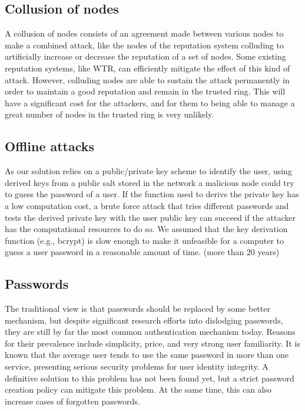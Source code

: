 \subsection{Collusion of nodes}

A collusion of nodes consists of an agreement made between various nodes to make
a combined attack, like the nodes of the reputation system colluding to artificially increase or decrease the reputation of a
set of nodes. Some existing
reputation systems, like WTR, can efficiently mitigate the effect of this kind
of attack. However, colluding nodes are able to sustain the attack
permanently in order to maintain a good reputation and remain in the trusted ring.
This will have a significant cost for the attackers, and for them to being able to manage a
great number of nodes in the trusted ring is very unlikely. 

\subsection{Offline attacks}
As our solution relies on a public/private key scheme to identify the user,
using derived keys from a public salt stored in the network a malicious node
could try to guess the password of a user. If the function used to derive the
private key has a low computation cost, a brute force attack that tries
different passwords and tests the derived private key with the user public key
can succeed if the attacker has the computational resources to do so. We
assumed that the key derivation function (e.g., bcrypt) is slow enough to make
it unfeasible for a computer to guess a user password in a reasonable 
amount of time. (more than 20 years)

\subsection{Passwords}
The traditional view is that passwords should be replaced by some better
mechanism, but despite significant research efforts into dislodging passwords,
they are still by far the most common authentication mechanism today.
Reasons for their prevalence include simplicity, price, and very strong user
familiarity.
It is known that the average user tends to use the
same password in more than one service, presenting serious security problems
for user identity integrity. A definitive solution to this problem has not
been found yet, but a strict password creation policy can mitigate this
problem. At the same time, this can also increase cases of forgotten passwords.

